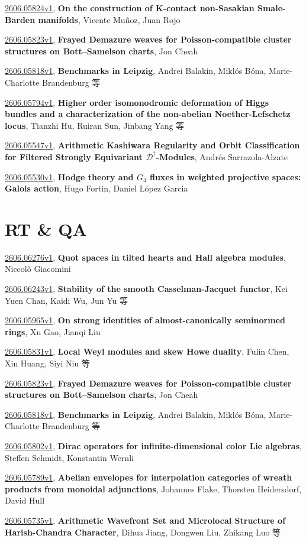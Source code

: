 \documentclass[9pt, a4paper]{article}
\theoremstyle{plain}
\theoremstyle{definition}
\theoremstyle{remark}
\newcommand{\arxiv}[3]{\href{https://arxiv.org/abs/#1}{#1}, \textbf{\textcolor{arxivblue}{#2}}, #3}
\begin{document}
\arxiv{2606.05824v1}{On the construction of K-contact non-Sasakian Smale-Barden manifolds}{Vicente Muñoz, Juan Rojo}

\arxiv{2606.05823v1}{Frayed Demazure weaves for Poisson-compatible cluster structures on Bott--Samelson charts}{Jon Cheah}

\arxiv{2606.05818v1}{Benchmarks in Leipzig}{Andrei Balakin, Miklós Bóna, Marie-Charlotte Brandenburg 等}

\arxiv{2606.05794v1}{Higher order isomonodromic deformation of Higgs bundles and a characterization of the non-abelian Noether-Lefschetz locus}{Tianzhi Hu, Ruiran Sun, Jinbang Yang 等}

\arxiv{2606.05547v1}{Arithmetic Kashiwara Regularity and Orbit Classification for Filtered Strongly Equivariant $\mathcal{D}^{\dagger}$-Modules}{Andrés Sarrazola-Alzate}

\arxiv{2606.05530v1}{Hodge theory and $G_4$ fluxes in weighted projective spaces: Galois action}{Hugo Fortin, Daniel López Garcia}


\section{RT \& QA}
\arxiv{2606.06276v1}{Quot spaces in tilted hearts and Hall algebra modules}{Niccolò Giacomini}

\arxiv{2606.06243v1}{Stability of the smooth Casselman-Jacquet functor}{Kei Yuen Chan, Kaidi Wu, Jun Yu 等}

\arxiv{2606.05965v1}{On strong identities of almost-canonically seminormed rings}{Xu Gao, Jianqi Liu}

\arxiv{2606.05831v1}{Local Weyl modules and skew Howe duality}{Fulin Chen, Xin Huang, Siyi Niu 等}

\arxiv{2606.05823v1}{Frayed Demazure weaves for Poisson-compatible cluster structures on Bott--Samelson charts}{Jon Cheah}

\arxiv{2606.05818v1}{Benchmarks in Leipzig}{Andrei Balakin, Miklós Bóna, Marie-Charlotte Brandenburg 等}

\arxiv{2606.05802v1}{Dirac operators for infinite-dimensional color Lie algebras}{Steffen Schmidt, Konstantin Wernli}

\arxiv{2606.05789v1}{Abelian envelopes for interpolation categories of wreath products from monoidal adjunctions}{Johannes Flake, Thorsten Heidersdorf, David Hull}

\arxiv{2606.05735v1}{Arithmetic Wavefront Set and Microlocal Structure of Harish-Chandra Character}{Dihua Jiang, Dongwen Liu, Zhikang Luo 等}
\end{document}
